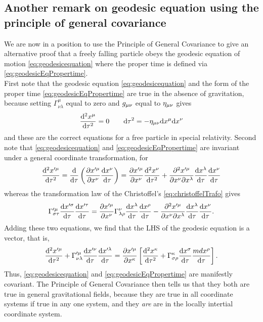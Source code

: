 \subsection{Another remark on geodesic equation using the principle of general covariance}
We are now in a position to use the Principle of General Covariance to give an alternative proof that a freely falling particle obeys the geodesic equation of motion \ref{eq:geodesicequation} where the proper time is defined via \ref{eq:geodesicEqPropertime}.\\
First note that the geodesic equation \ref{eq:geodesicequation} and the form of the proper time \ref{eq:geodesicEqPropertime} are true in the absence of gravitation, because setting $\Gamma^\mu_{\nu \lambda}$ equal to zero and $g_{\mu \nu}$ equal to $\eta_{\mu \nu}$ gives
\begin{equation}
\frac{\mathrm{d}^2x^\mu}{\mathrm{d} \tau^2} = 0 \qquad \mathrm{d} \tau^2 = - \eta_{\mu \nu} \mathrm{d} x^\mu \mathrm{d} x^\nu
\end{equation}
and these are the correct equations for a free particle in special relativity. Second note that \ref{eq:geodesicequation} and \ref{eq:geodesicEqPropertime} are invariant under a general coordinate transformation, for
\begin{equation}
\frac{\mathrm{d}^2 x^{\prime \mu}}{\mathrm{d} \tau^2} = \frac{\mathrm{d} }{\mathrm{d} \tau} \left( \frac{\partial x^{\prime \mu}}{\partial x^\nu} \frac{\mathrm{d} x^\nu}{\mathrm{d} \tau}\right) = \frac{\partial x^{\prime \mu}}{\partial x^\nu} \frac{\mathrm{d}^2 x^\nu}{\mathrm{d} \tau^2} + \frac{\partial^2 x^{\prime \mu}}{\partial x^\nu \partial x^\lambda} \frac{\mathrm{d} x^\lambda}{\mathrm{d} \tau} \frac{\mathrm{d} x^\nu}{\mathrm{d} \tau}
\end{equation}
whereas the transformation law of the Christoffel's \ref{eq:christoffelTrafo} gives
\begin{equation}
\Gamma^{\prime \mu}_{\sigma \tau}  \frac{\mathrm{d} x^{\prime \sigma}}{\mathrm{d} \tau} \frac{\mathrm{d} x^{\prime \tau}}{\mathrm{d} \tau} = \frac{\partial x^{\prime \mu}}{\partial x^\nu} \Gamma^\nu_{\lambda \rho} \frac{\mathrm{d} x^\lambda}{\mathrm{d} \tau} \frac{\mathrm{d} x^\rho}{\mathrm{d} \tau} -  \frac{\partial^2 x^{\prime \mu}}{\partial x^\nu  \partial x^\lambda} \frac{\mathrm{d} x^\lambda}{\mathrm{d} \tau} \frac{\mathrm{d} x^\nu}{\mathrm{d} \tau}.
\end{equation}
Adding these two equations, we find that the LHS of the geodesic equation is a vector, that is,
\begin{equation}
\frac{\mathrm{d}^2 x^{\prime \mu}}{\mathrm{d} \tau^2} + \Gamma^{\prime \mu}_{\nu \lambda} \frac{\mathrm{d} x^{\prime \nu}}{\mathrm{d} \tau} \frac{\mathrm{d} x^{\prime \lambda}}{\mathrm{d} \tau} = \frac{\partial x^{\prime \mu}}{\partial x^\kappa} \left[\frac{\mathrm{d}^2 x^\kappa}{\mathrm{d} \tau^2} + \Gamma^\kappa_{\sigma \rho} \frac{\mathrm{d} x^\sigma}{\mathrm{d} \tau} \frac{md x^\rho}{\mathrm{d} \tau}\right].
\end{equation}
Thus, \ref{eq:geodesicequation} and \ref{eq:geodesicEqPropertime} are manifestly covariant. The Principle of General Covariance then tells us that they both are true in general gravitational fields, because they are true in all coordinate systems if true in any one system, and they \emph{are} are in the locally intertial coordinate system.







